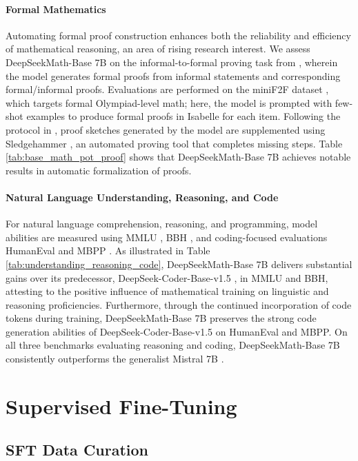 \paragraph{Formal Mathematics}

Automating formal proof construction enhances both the reliability and efficiency of mathematical reasoning, an area of rising research interest. We assess DeepSeekMath-Base 7B on the informal-to-formal proving task from \citep{dsp_proof}, wherein the model generates formal proofs from informal statements and corresponding formal/informal proofs. Evaluations are performed on the miniF2F dataset \citep{minif2f}, which targets formal Olympiad-level math; here, the model is prompted with few-shot examples to produce formal proofs in Isabelle for each item. Following the protocol in \cite{dsp_proof}, proof sketches generated by the model are supplemented using Sledgehammer \citep{sledgehammer}, an automated proving tool that completes missing steps. Table \ref{tab:base_math_pot_proof} shows that DeepSeekMath-Base 7B achieves notable results in automatic formalization of proofs.

\paragraph{Natural Language Understanding, Reasoning, and Code}

For natural language comprehension, reasoning, and programming, model abilities are measured using MMLU \citep{mmlu}, BBH \citep{bbh}, and coding-focused evaluations HumanEval \citep{codex} and MBPP \citep{mbpp}. As illustrated in Table \ref{tab:understanding_reasoning_code}, DeepSeekMath-Base 7B delivers substantial gains over its predecessor, DeepSeek-Coder-Base-v1.5 \citep{deepseek-coder}, in MMLU and BBH, attesting to the positive influence of mathematical training on linguistic and reasoning proficiencies. Furthermore, through the continued incorporation of code tokens during training, DeepSeekMath-Base 7B preserves the strong code generation abilities of DeepSeek-Coder-Base-v1.5 on HumanEval and MBPP. On all three benchmarks evaluating reasoning and coding, DeepSeekMath-Base 7B consistently outperforms the generalist Mistral 7B \citep{mistral}.

\section{Supervised Fine-Tuning}

\subsection{SFT Data Curation}

